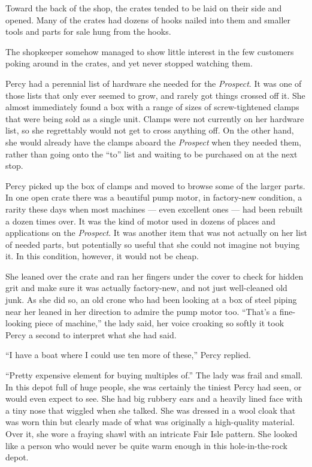 \documentclass[
]{scrbook}
\begin{document}
Toward the back of the shop, the crates tended to be laid on their side
and opened. Many of the crates had dozens of hooks nailed into them and
smaller tools and parts for sale hung from the hooks.

The shopkeeper somehow managed to show little interest in the few
customers poking around in the crates, and yet never stopped watching
them.

Percy had a perennial list of hardware she needed for the
\emph{Prospect}. It was one of those lists that only ever seemed to
grow, and rarely got things crossed off it. She almost immediately found
a box with a range of sizes of screw-tightened clamps that were being
sold as a single unit. Clamps were not currently on her hardware list,
so she regrettably would not get to cross anything off. On the other
hand, she would already have the clamps aboard the \emph{Prospect} when
they needed them, rather than going onto the ``to'' list and waiting to
be purchased on at the next stop.

Percy picked up the box of clamps and moved to browse some of the larger
parts. In one open crate there was a beautiful pump motor, in
factory-new condition, a rarity these days when most machines --- even
excellent ones --- had been rebuilt a dozen times over. It was the kind
of motor used in dozens of places and applications on the
\emph{Prospect}. It was another item that was not actually on her list
of needed parts, but potentially so useful that she could not imagine
not buying it. In this condition, however, it would not be cheap.

She leaned over the crate and ran her fingers under the cover to check
for hidden grit and make sure it was actually factory-new, and not just
well-cleaned old junk. As she did so, an old crone who had been looking
at a box of steel piping near her leaned in her direction to admire the
pump motor too. ``That's a fine-looking piece of machine,'' the lady
said, her voice croaking so softly it took Percy a second to interpret
what she had said.

``I have a boat where I could use ten more of these,'' Percy replied.

``Pretty expensive element for buying multiples of.'' The lady was frail
and small. In this depot full of huge people, she was certainly the
tiniest Percy had seen, or would even expect to see. She had big rubbery
ears and a heavily lined face with a tiny nose that wiggled when she
talked. She was dressed in a wool cloak that was worn thin but clearly
made of what was originally a high-quality material. Over it, she wore a
fraying shawl with an intricate Fair Isle pattern. She looked like a
person who would never be quite warm enough in this hole-in-the-rock
depot.
\end{document}
